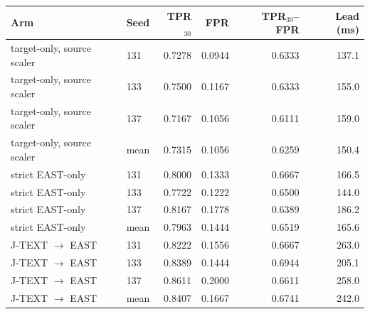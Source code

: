 \begin{tabular}{llrrrr}
\toprule
Arm & Seed & TPR$_{30}$ & FPR & TPR$_{30}$--FPR & Lead (ms) \\
\midrule
target-only, source scaler & 131 & 0.7278 & 0.0944 & 0.6333 & 137.1 \\
target-only, source scaler & 133 & 0.7500 & 0.1167 & 0.6333 & 155.0 \\
target-only, source scaler & 137 & 0.7167 & 0.1056 & 0.6111 & 159.0 \\
target-only, source scaler & mean & 0.7315 & 0.1056 & 0.6259 & 150.4 \\
\addlinespace
strict EAST-only & 131 & 0.8000 & 0.1333 & 0.6667 & 166.5 \\
strict EAST-only & 133 & 0.7722 & 0.1222 & 0.6500 & 144.0 \\
strict EAST-only & 137 & 0.8167 & 0.1778 & 0.6389 & 186.2 \\
strict EAST-only & mean & 0.7963 & 0.1444 & 0.6519 & 165.6 \\
\addlinespace
J-TEXT $\rightarrow$ EAST & 131 & 0.8222 & 0.1556 & 0.6667 & 263.0 \\
J-TEXT $\rightarrow$ EAST & 133 & 0.8389 & 0.1444 & 0.6944 & 205.1 \\
J-TEXT $\rightarrow$ EAST & 137 & 0.8611 & 0.2000 & 0.6611 & 258.0 \\
J-TEXT $\rightarrow$ EAST & mean & 0.8407 & 0.1667 & 0.6741 & 242.0 \\
\bottomrule
\end{tabular}

